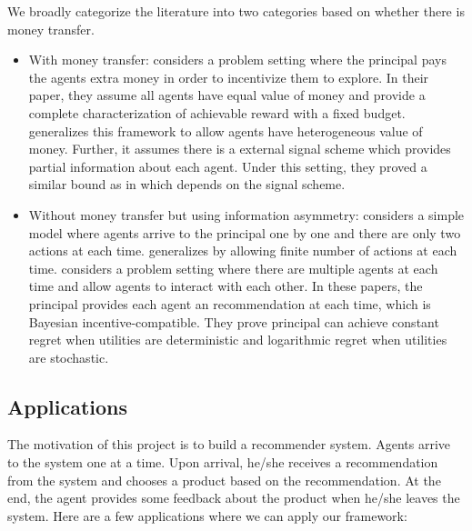 \documentclass{article}
\begin{document}
We broadly categorize the literature into two categories based on whether there is money transfer.

\begin{itemize}
\item With money transfer: \cite{frazier2014incentivizing} considers a problem setting where the principal pays the agents extra money in order to incentivize them to explore. In their paper, they assume all agents have equal value of money and provide a complete characterization of achievable reward with a fixed budget. \cite{han2015incentivizing} generalizes this framework to allow agents have heterogeneous value of money. Further, it assumes there is a external signal scheme which provides partial information about each agent. Under this setting, they proved a similar bound as in \cite{frazier2014incentivizing} which depends on the signal scheme.
\item Without money transfer but using information asymmetry: \cite{kremer2014implementing} considers a simple model where agents arrive to the principal one by one and there are only two actions at each time. \cite{mansour2015bayesian} generalizes \cite{kremer2014implementing} by allowing finite number of actions at each time. \cite{mansour2016bayesian} considers a problem setting where there are multiple agents at each time and allow agents to interact with each other. In these papers, the principal provides each agent an recommendation at each time, which is Bayesian incentive-compatible. They prove principal can achieve constant regret when utilities are deterministic and logarithmic regret when utilities are stochastic.
\end{itemize}

\subsection{Applications}

The motivation of this project is to build a recommender system. Agents arrive to the system one at a time. Upon arrival, he/she receives a recommendation from the system and chooses a product based on the recommendation. At the end, the agent provides some feedback about the product when he/she leaves the system. Here are a few applications where we can apply our framework:
\end{document}

